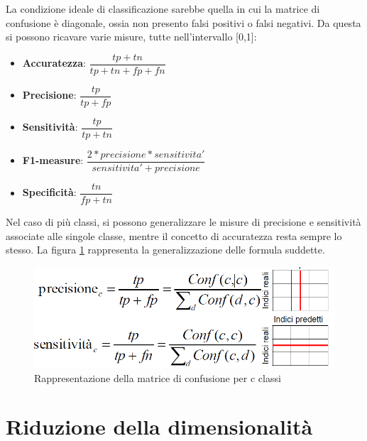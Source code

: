 La condizione ideale di classificazione sarebbe quella in cui la matrice di confusione è diagonale, ossia non presento falsi positivi o falsi negativi. Da questa si possono ricavare varie misure, tutte nell'intervallo [0,1]:
\begin{itemize}
	\item \textbf{Accuratezza}: $\dfrac{tp+tn}{tp+tn+fp+fn}$
	\item \textbf{Precisione}: $\dfrac{tp}{tp+fp}$
	\item \textbf{Sensitività}: $\dfrac{tp}{tp+tn}$
	\item \textbf{F1-measure}: $\dfrac{2*precisione*sensitivita' }{sensitivita' + precisione}$
	\item \textbf{Specificità}: $\dfrac{tn}{fp+tn}$
\end{itemize}
Nel caso di più classi, si possono generalizzare le misure di precisione e sensitività associate alle singole classe, mentre il concetto di accuratezza resta sempre lo stesso. La figura \ref{immagine_matrice_confusione_cclassi} rappresenta la generalizzazione delle formula suddette.
\begin{figure}[h!]
	\centering
	\includegraphics[scale=0.5]{images/matrice_confusione_cclassi.png}
	\caption{Rappresentazione della matrice di confusione per c classi}
	\label{immagine_matrice_confusione_cclassi}
\end{figure}

\section{Riduzione della dimensionalità}
